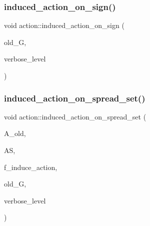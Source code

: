\mbox{\label{classaction_ab17b07971b94eae7c5efa21b33f643f1}} 
\subsubsection{\texorpdfstring{induced\+\_\+action\+\_\+on\+\_\+sign()}{induced\_action\_on\_sign()}}
{\footnotesize\ttfamily void action\+::induced\+\_\+action\+\_\+on\+\_\+sign (\begin{DoxyParamCaption}\item[{\mbox{\hyperlink{classsims}{sims}} $\ast$}]{old\+\_\+G,  }\item[{\mbox{\hyperlink{galois_8h_a09fddde158a3a20bd2dcadb609de11dc}{I\+NT}}}]{verbose\+\_\+level }\end{DoxyParamCaption})}

\mbox{\label{classaction_a7c5839c650592f083dc850d81ed05a5b}} 
\subsubsection{\texorpdfstring{induced\+\_\+action\+\_\+on\+\_\+spread\+\_\+set()}{induced\_action\_on\_spread\_set()}}
{\footnotesize\ttfamily void action\+::induced\+\_\+action\+\_\+on\+\_\+spread\+\_\+set (\begin{DoxyParamCaption}\item[{\mbox{\hyperlink{classaction}{action}} $\ast$}]{A\+\_\+old,  }\item[{\mbox{\hyperlink{classaction__on__spread__set}{action\+\_\+on\+\_\+spread\+\_\+set}} $\ast$}]{AS,  }\item[{\mbox{\hyperlink{galois_8h_a09fddde158a3a20bd2dcadb609de11dc}{I\+NT}}}]{f\+\_\+induce\+\_\+action,  }\item[{\mbox{\hyperlink{classsims}{sims}} $\ast$}]{old\+\_\+G,  }\item[{\mbox{\hyperlink{galois_8h_a09fddde158a3a20bd2dcadb609de11dc}{I\+NT}}}]{verbose\+\_\+level }\end{DoxyParamCaption})}

